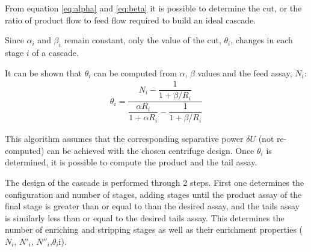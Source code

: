 \documentclass{anstrans}
\begin{document}
From equation \eqref{eq:alpha} and \eqref{eq:beta} it is possible to determine
the cut, or the ratio of product flow to feed flow
required to build an ideal cascade.

Since $\alpha_{i}$ and $\beta_{i}$ remain constant, only the value of the cut,
$\theta_{i}$, changes in each stage $i$ of a cascade.

It can be shown that $\theta_{i}$ can be computed from $\alpha$,
$\beta$ values and the feed assay, $N_{i}$:
\begin{eqnarray}
    \theta_{i} = \dfrac{N_{i} - \dfrac{1}{1 + \beta/R_{i}}}{ \dfrac{\alpha R_{i}}{1 + \alpha R_{i}} -
           \dfrac{1}{1 + \beta/R_{i}}}
\end{eqnarray}

This algorithm assumes that the corresponding separative power $\delta U$ (not
re-computed) can be achieved with the chosen centrifuge design. Once
$\theta_{i}$ is determined, it is possible to compute the product and the tail
assay.

The design of the cascade is performed through 2 steps. First one determines the
configuration and number of stages, adding stages until the product assay of the final stage is greater than or equal to than the desired assay, and the tails assay is similarly less than or equal to the desired tails assay. This determines the number of enriching and stripping stages as
well as their enrichment properties ($N_{i}$, $N'_{i}$,
$N''_{i}$,$\theta_{i}$i).
\end{document}
